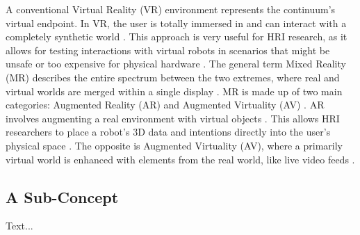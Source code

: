 A conventional Virtual Reality (VR) environment represents the continuum's virtual endpoint. In VR, the user is totally immersed in and can interact with a completely synthetic world \cite{Milgram1994}. This approach is very useful for HRI research, as it allows for testing interactions with virtual robots in scenarios that might be unsafe or too expensive for physical hardware \cite{Walker2023}. The general term Mixed Reality (MR) describes the entire spectrum between the two extremes, where real and virtual worlds are merged within a single display \cite{Milgram1994}. MR is made up of two main categories: Augmented Reality (AR) and Augmented Virtuality (AV) \cite{Milgram1994, Makhataeva2020}. AR involves augmenting a real environment with virtual objects \cite{Milgram1994}. This allows HRI researchers to place a robot's 3D data and intentions directly into the user's physical space \cite{Walker2023}. The opposite is Augmented Virtuality (AV), where a primarily virtual world is enhanced with elements from the real world, like live video feeds \cite{Milgram1994}.


\subsection{A Sub-Concept}
\label{ssec:sub_concept}
Text...

